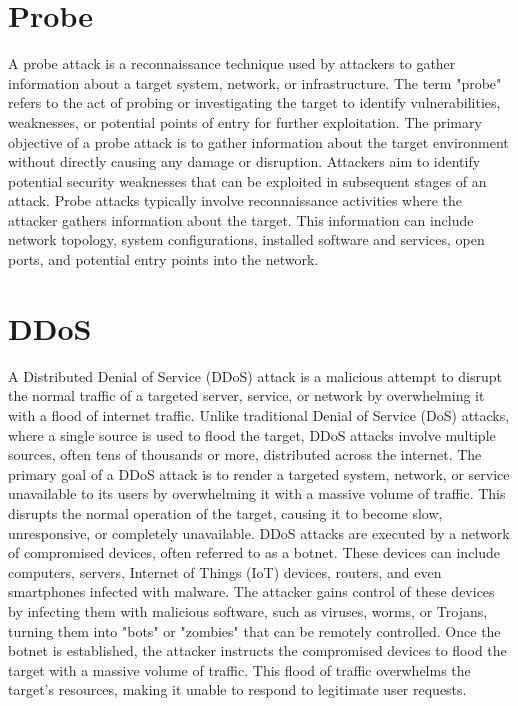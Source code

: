 \section{Probe}
\vspace{-18pt}
A probe attack is a reconnaissance technique used by attackers to gather information about a target system, network, or infrastructure. The term "probe" refers to the act of probing or investigating the target to identify vulnerabilities, weaknesses, or potential points of entry for further exploitation. The primary objective of a probe attack is to gather information about the target environment without directly causing any damage or disruption. Attackers aim to identify potential security weaknesses that can be exploited in subsequent stages of an attack. Probe attacks typically involve reconnaissance activities where the attacker gathers information about the target. This information can include network topology, system configurations, installed software and services, open ports, and potential entry points into the network.
\section{DDoS}
\vspace{-18pt}
A Distributed Denial of Service (DDoS) attack is a malicious attempt to disrupt the normal traffic of a targeted server, service, or network by overwhelming it with a flood of internet traffic. Unlike traditional Denial of Service (DoS) attacks, where a single source is used to flood the target, DDoS attacks involve multiple sources, often tens of thousands or more, distributed across the internet. The primary goal of a DDoS attack is to render a targeted system, network, or service unavailable to its users by overwhelming it with a massive volume of traffic. This disrupts the normal operation of the target, causing it to become slow, unresponsive, or completely unavailable. DDoS attacks are executed by a network of compromised devices, often referred to as a botnet. These devices can include computers, servers, Internet of Things (IoT) devices, routers, and even smartphones infected with malware. The attacker gains control of these devices by infecting them with malicious software, such as viruses, worms, or Trojans, turning them into "bots" or "zombies" that can be remotely controlled. Once the botnet is established, the attacker instructs the compromised devices to flood the target with a massive volume of traffic. This flood of traffic overwhelms the target's resources, making it unable to respond to legitimate user requests.

